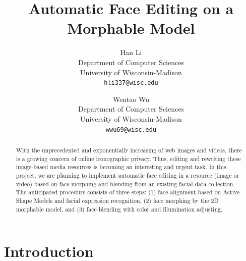 \documentclass[10pt,letterpaper]{article}
\begin{document}
\title{Automatic Face Editing on a Morphable Model}

\author{Han Li\\
Department of Computer Sciences\\
University of Wisconsin-Madison\\
{\tt\small hli337@wisc.edu}
\and
Wentao Wu\\
Department of Computer Sciences\\
University of Wisconsin-Madison\\
{\tt\small wwu69@wisc.edu}
}

\maketitle

\begin{abstract}
With the unprecedented and exponentially increasing of web images and videos,  there is a growing concern of online iconographic privacy. Thus, editing and rewriting these image-based media resources is becoming an interesting and urgent task. In this project, we are planning to implement automatic face editing in a resource (image or video) based on face morphing and blending from an existing facial data collection. The anticipated procedure consists of three steps: (1) face alignment based on Active Shape Models and facial expression recognition, (2) face morphing by the 2D morphable model, and (3) face blending with color and illumination adjusting.

\end{abstract}

\section{Introduction}
\label{sect:intro}
\end{document}
